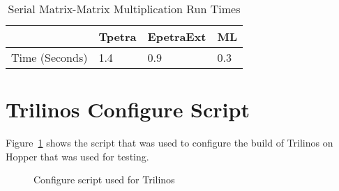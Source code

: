 \documentclass[pdf,12pt, strict]{SANDreport}
\begin{document}
\begin{table}
\centering
\begin{tabular}{ | l | l | l | l | }
\hline
 & Tpetra & EpetraExt & ML \\ \hline
Time (Seconds) & 1.4 & 0.9 & 0.3 \\ \hline
\end{tabular}
\caption{Serial Matrix-Matrix Multiplication Run Times}
\label{serialTable}
\end{table}

\clearpage
\providecommand*{\phantomsection}{}
\phantomsection
{}



\appendix
\section{Trilinos Configure Script}
Figure~\ref{triConf} shows the script that was used to configure the build of Trilinos on Hopper that was used for testing.
\begin{figure}
\centering
{\footnotesize
{}
}
\caption{Configure script used for Trilinos}
\label{triConf}
\end{figure}
\begin{SANDdistribution}[NM]

\end{SANDdistribution}
\end{document}
